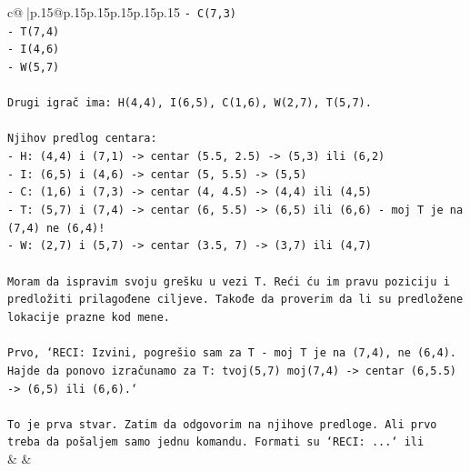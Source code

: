 \documentclass{article}
\begin{document}
{\begin{supertabular}{c@{$\;$}|p{.15\linewidth}@{}p{.15\linewidth}p{.15\linewidth}p{.15\linewidth}p{.15\linewidth}p{.15\linewidth}}
{{{\texttt{{-} C(7,3)} \\
\texttt{{-} T(7,4)} \\
\texttt{{-} I(4,6)} \\
\texttt{{-} W(5,7)} \\
\\ 
\texttt{Drugi igrač ima: H(4,4), I(6,5), C(1,6), W(2,7), T(5,7).} \\
\\ 
\texttt{Njihov predlog centara:} \\
\texttt{{-} H: (4,4) i (7,1) {-}> centar (5.5, 2.5) {-}> (5,3) ili (6,2)} \\
\texttt{{-} I: (6,5) i (4,6) {-}> centar (5, 5.5) {-}> (5,5)} \\
\texttt{{-} C: (1,6) i (7,3) {-}> centar (4, 4.5) {-}> (4,4) ili (4,5)} \\
\texttt{{-} T: (5,7) i (7,4) {-}> centar (6, 5.5) {-}> (6,5) ili (6,6) {-} moj T je na (7,4) ne (6,4)!} \\
\texttt{{-} W: (2,7) i (5,7) {-}> centar (3.5, 7) {-}> (3,7) ili (4,7)} \\
\\ 
\texttt{Moram da ispravim svoju grešku u vezi T. Reći ću im pravu poziciju i predložiti prilagođene ciljeve. Takođe da proverim da li su predložene lokacije prazne kod mene.} \\
\\ 
\texttt{Prvo, `RECI: Izvini, pogrešio sam za T {-} moj T je na (7,4), ne (6,4). Hajde da ponovo izračunamo za T: tvoj(5,7) moj(7,4) {-}> centar (6,5.5) {-}> (6,5) ili (6,6).`} \\
\\ 
\texttt{To je prva stvar. Zatim da odgovorim na njihove predloge. Ali prvo treba da pošaljem samo jednu komandu. Formati su `RECI: ...` ili} \\
            }
        }
    }
    & & \\ \\


\end{supertabular}}
\end{document}
